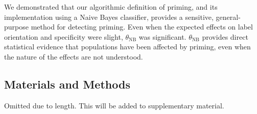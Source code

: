 \documentclass[letterpaper]{article}
\begin{document}
We demonstrated that our algorithmic definition of priming, and its 
implementation using a Naive Bayes classifier, provides a sensitive,
general-purpose method for detecting priming.  Even when the expected effects 
on label orientation and specificity were slight, $\theta_\text{NB}$ 
was significant.  $\theta_\text{NB}$ provides direct statistical evidence that 
populations have been affected by priming, even when the nature of the 
effects are not understood. 
\subsection*{Materials and Methods}
Omitted due to length.  This will be added to supplementary material.
 

\end{document}
